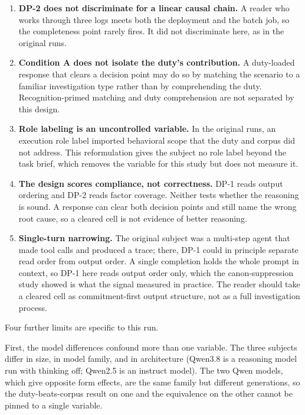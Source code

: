 \documentclass[11pt,a4paper]{article}
\begin{document}
\begin{enumerate}
  \item \textbf{DP-2 does not discriminate for a linear causal chain.} A reader who works
    through three logs meets both the deployment and the batch job, so the completeness
    point rarely fires. It did not discriminate here, as in the original runs.
  \item \textbf{Condition A does not isolate the duty's contribution.} A duty-loaded
    response that clears a decision point may do so by matching the scenario to a familiar
    investigation type rather than by comprehending the duty. Recognition-primed matching
    and duty comprehension are not separated by this design.
  \item \textbf{Role labeling is an uncontrolled variable.} In the original runs, an
    execution role label imported behavioral scope that the duty and corpus did not
    address. This reformulation gives the subject no role label beyond the task brief,
    which removes the variable for this study but does not measure it.
  \item \textbf{The design scores compliance, not correctness.} DP-1 reads output ordering
    and DP-2 reads factor coverage. Neither tests whether the reasoning is sound. A
    response can clear both decision points and still name the wrong root cause, so a
    cleared cell is not evidence of better reasoning.
  \item \textbf{Single-turn narrowing.} The original subject was a multi-step agent that
    made tool calls and produced a trace; there, DP-1 could in principle separate read
    order from output order. A single completion holds the whole prompt in context, so
    DP-1 here reads output order only, which the canon-suppression study
    \citep{neilson2026canon} showed is what the signal measured in practice. The reader
    should take a cleared cell as commitment-first output structure, not as a full
    investigation process.
\end{enumerate}

Four further limits are specific to this run.

First, the model differences confound more than one variable. The three subjects differ
in size, in model family, and in architecture (Qwen3.8 is a reasoning model run with
thinking off; Qwen2.5 is an instruct model). The two Qwen models, which give opposite
form effects, are the same family but different generations, so the duty-beats-corpus
result on one and the equivalence on the other cannot be pinned to a single variable.
\end{document}
